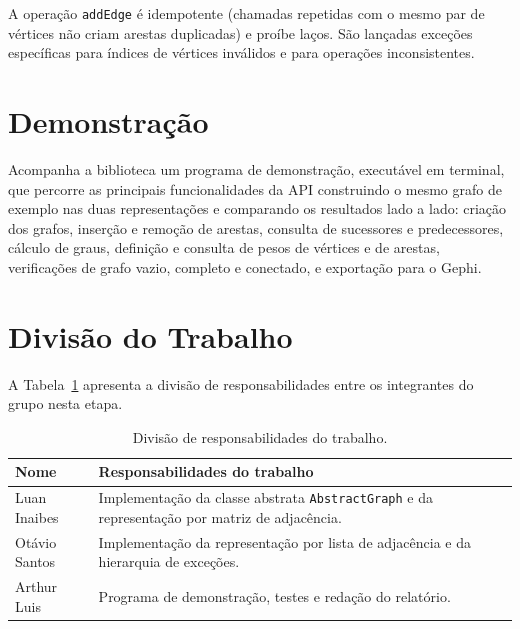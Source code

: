 \documentclass[12pt]{article}
\begin{document}
A operação \texttt{addEdge} é idempotente (chamadas repetidas com o mesmo par de
vértices não criam arestas duplicadas) e proíbe laços. São lançadas
exceções específicas para índices de vértices inválidos e para operações
inconsistentes.

\section{Demonstração}

Acompanha a biblioteca um programa de demonstração, executável em
terminal, que percorre as principais funcionalidades da API construindo o
mesmo grafo de exemplo nas duas representações e comparando os resultados
lado a lado: criação dos grafos, inserção e remoção de arestas, consulta
de sucessores e predecessores, cálculo de graus, definição e consulta de
pesos de vértices e de arestas, verificações de grafo vazio, completo e
conectado, e exportação para o Gephi.
\section{Divisão do Trabalho}

A Tabela~\ref{tab:responsabilidades} apresenta a divisão de
responsabilidades entre os integrantes do grupo nesta etapa.

\begin{table}[ht]
\centering
\caption{Divisão de responsabilidades do trabalho.}
\label{tab:responsabilidades}
\begin{tabular}{|l|p{8cm}|}
\hline
\textbf{Nome} & \textbf{Responsabilidades do trabalho} \\
\hline
Luan Inaibes & Implementação da classe abstrata \texttt{AbstractGraph}
e da representação por matriz de adjacência. \\
\hline
Otávio Santos & Implementação da representação por lista de adjacência
e da hierarquia de exceções. \\
\hline
Arthur Luis & Programa de demonstração, testes e
redação do relatório. \\
\hline
\end{tabular}
\end{table}
\end{document}
